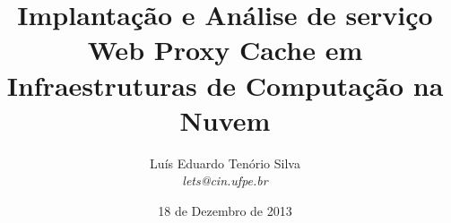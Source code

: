 \documentclass{beamer}
\title[TCC]{Implantação e Análise de serviço Web Proxy Cache em Infraestruturas de Computação na Nuvem}
\author{Luís Eduardo Tenório Silva\\\textit{lets@cin.ufpe.br}}
\date[18/12/13]{18 de Dezembro de 2013}
\begin{document}
    \frame{\titlepage}
    \frame{\tableofcontents}
\end{document}

